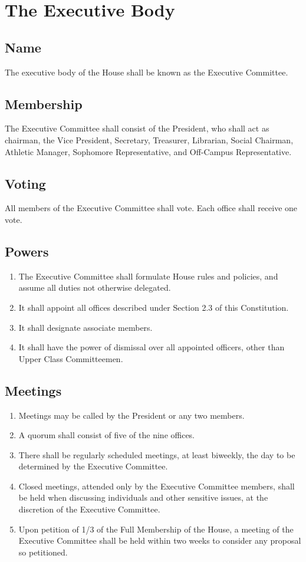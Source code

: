 \documentclass[10pt]{article} %
\begin{document}
\section{The Executive Body}
\subsection{Name}
The executive body of the House shall be known as the Executive Committee.
\subsection{Membership}
The Executive Committee shall consist of the President, who shall act as chairman, the Vice President, Secretary, Treasurer, Librarian, Social Chairman, Athletic Manager, Sophomore Representative, and Off-Campus Representative.
\subsection{Voting}
All members of the Executive Committee shall vote. Each office shall receive one vote.
\subsection{Powers}
\begin{enumerate}
\item The Executive Committee shall formulate House rules and policies, and assume all duties not otherwise delegated.
\item It shall appoint all offices described under Section 2.3 of this Constitution.
\item It shall designate associate members.
\item It shall have the power of dismissal over all appointed officers, other than Upper Class Committeemen.
\end{enumerate}
\subsection{Meetings}
\begin{enumerate}
\item Meetings may be called by the President or any two members.
\item A quorum shall consist of five of the nine offices.
\item There shall be regularly scheduled meetings, at least biweekly, the day to be determined by the Executive Committee.
\item Closed meetings, attended only by the Executive Committee members, shall be held when discussing individuals and other sensitive issues, at the discretion of the Executive Committee.
\item Upon petition of 1/3 of the Full Membership of the House, a meeting of the Executive Committee shall be held within two weeks to consider any proposal so petitioned.
\end{enumerate}
\end{document}
